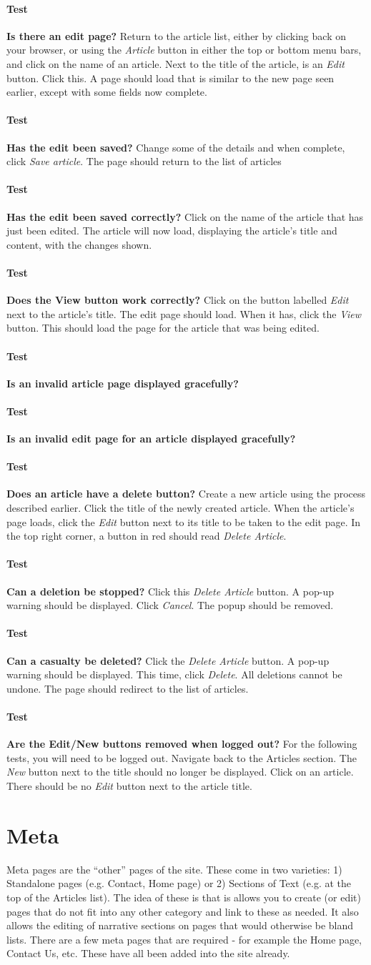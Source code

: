 \documentclass[12pt]{article}
\newcounter{Test}
\newcommand{\test}[1]{%
\stepcounter{Test}%
\paragraph{Test \theTest} \textbf{#1} }
\begin{document}
\test{Is there an edit page?}
Return to the article list, either by clicking back on your browser, or using the \textit{Article} button in either the top or bottom menu bars, and click on the name of an article. Next to the title of the article, is an \textit{Edit} button. Click this. A page should load that is similar to the new page seen earlier, except with some fields now complete.

\test{Has the edit been saved?}
Change some of the details and when complete, click \textit{Save article}. The page should return to the list of articles

\test{Has the edit been saved correctly?}
Click on the name of the article that has just been edited. The article will now load, displaying the article's title and content, with the changes shown.

\test{Does the View button work correctly?}
Click on the button labelled \textit{Edit} next to the article's title. The edit page should load. When it has, click the \textit{View} button. This should load the page for the article that was being edited.

\test{Is an invalid article page displayed gracefully?}

\test{Is an invalid edit page for an article displayed gracefully?}

\test{Does an article have a delete button?}
Create a new article using the process described earlier. Click the title of the newly created article. When the article's page loads, click the \textit{Edit} button next to its title to be taken to the edit page. In the top right corner, a button in red should read \textit{Delete Article}.

\test{Can a deletion be stopped?}
Click this \textit{Delete Article} button. A pop-up warning should be displayed. Click \textit{Cancel}. The popup should be removed.

\test{Can a casualty be deleted?}
Click the \textit{Delete Article} button. A pop-up warning should be displayed. This time, click \textit{Delete}. All deletions cannot be undone. The page should redirect to the list of articles.

\test{Are the Edit/New buttons removed when logged out?}
For the following tests, you will need to be logged out. Navigate back to the Articles section. The \textit{New} button next to the title should no longer be displayed. Click on an article. There should be no \textit{Edit} button next to the article title.

\section{Meta}\label{sec:meta}
Meta pages are the ``other'' pages of the site. These come in two varieties: 1) Standalone pages (e.g. Contact, Home page) or 2) Sections of Text (e.g. at the top of the Articles list). The idea of these is that is allows you to create (or edit) pages that do not fit into any other category and link to these as needed. It also allows the editing of narrative sections on pages that would otherwise be bland lists. There are a few meta pages that are required - for example the Home page, Contact Us, etc. These have all been added into the site already.
\end{document}
